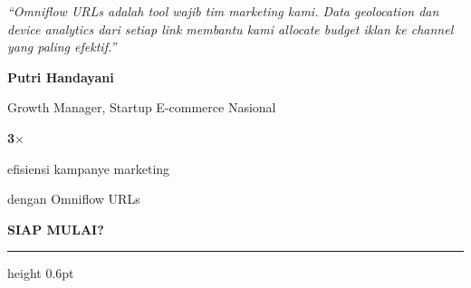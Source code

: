 \documentclass[a4paper]{article}
\newcommand{\sectiontitle}[1]{%
    \vspace{10pt}%
    {\fontsize{13}{16}\selectfont\bfseries\color{BlueDark} #1}\par\vspace{3pt}%
    {\color{BluePrimary}\hrule height 0.6pt}\par\vspace{8pt}%
}
\begin{document}
\noindent
\begin{minipage}[t]{0.485\textwidth}
    \colorbox{BlueBg}{%
        \begin{minipage}{\dimexpr\linewidth-2\fboxsep\relax}
            {\fontsize{9.5}{13}\selectfont\color{TextDark}\textit{``Omniflow URLs adalah tool wajib tim marketing kami. Data geolocation dan device analytics dari setiap link membantu kami allocate budget iklan ke channel yang paling efektif.''}}\par\vspace{4pt}
            {\fontsize{8.5}{11}\selectfont\bfseries\color{BluePrimary} Putri Handayani}\par
            {\fontsize{8}{10}\selectfont\color{TextLight} Growth Manager, Startup E-commerce Nasional}
        \end{minipage}}
\end{minipage}%
\hfill
\begin{minipage}[t]{0.485\textwidth}
    \colorbox{BlueBg}{%
        \begin{minipage}{\dimexpr\linewidth-2\fboxsep\relax}
            \begin{center}
                {\fontsize{20}{24}\selectfont\bfseries\color{CyanPrimary} 3$\times$}\par
                {\fontsize{9.5}{12}\selectfont\color{TextDark} efisiensi kampanye marketing}\par
                {\fontsize{9.5}{12}\selectfont\color{TextDark} dengan Omniflow URLs}
            \end{center}
        \end{minipage}}
\end{minipage}

\sectiontitle{SIAP MULAI?}
\end{document}
